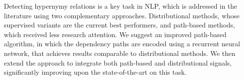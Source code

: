 Detecting hypernymy relations is a key task in NLP, which is addressed in the literature using two complementary approaches. Distributional methods, whose supervised variants are the current best performers, and path-based methods, which received less research attention. We suggest an improved path-based algorithm, in which the dependency paths are encoded using a recurrent neural network, that achieves results comparable to distributional methods. We then extend the approach to integrate both path-based and distributional signals, significantly improving upon the state-of-the-art on this task.
